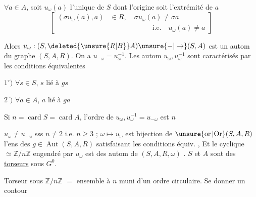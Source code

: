 $\forall a\in A$, soit $u_{\omega}(a)$ l'unique  de $S$ dont l'origine soit l'extrémité de $a$
\[
\left[\begin{aligned}
(\sigma u_{\omega}(a),a)&\in R,\quad \sigma u_{\omega}(a)\ne\sigma a\\
&\hspace{6em}\text{i.e.}\quad u_{\omega}(a)\ne a
\end{aligned}\right]
\]

\margin{$\big\}$}Alors $u_{\omega}:(S,\deleted{\unsure{R|B}}A)\unsure{-|\to}(S,A)$ est un autom du graphe $(S,A,R)$. On a $u_{-\omega}=u_{\omega}^{-1}$. Les autom $u_{\omega},u_{\omega}^{-1}$ sont caractérisés par les  conditions équivalentes

$1^{\circ})$ $\forall s\in S$, $s$ lié à $gs$

$2^{\circ})$ $\forall a\in A$, $a$ lié à $ga$

Si $n=\operatorname{card}S=\operatorname{card}A$, l'ordre de $u_{\omega},u_{\omega}^{-1}=u_{-\omega}$ est $n$

 $u_{\omega}\ne u_{-\omega}$ sss $n\ne2$ i.e. $n\geq3$ ;  $\omega\longmapsto u_{\omega}$ est bijection de $\unsure{\operatorname{or}|{\rm Or}}(S,A,R)$  l'ens des $g\in\operatorname{Aut}(S,A,R)$ satisfaisant les conditions équiv. , Et le  cyclique $\simeq\mathbb{Z}/n\mathbb{Z}$ engendré par $u_{\omega}$ est    des autom  de $(S,A,R,\omega)$ . $S$ et $A$ sont des \uline{torseurs} sous $G^{0}$.


Torseur sous $\mathbb{Z}/n\mathbb{Z}$  $=$ ensemble  à $n$  muni d'un ordre \unsure{$^{\times}$|$^{*}$} circulaire. Se donner un contour
